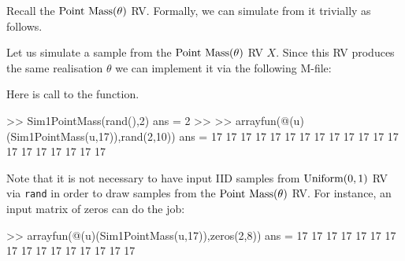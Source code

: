 Recall the $\pointmass(\theta)$ RV. Formally, we can simulate from it trivially as follows.
\begin{simulation}[$\pointmass(\theta)$]\label{SIM:PointMass}
Let us simulate a sample from the $\pointmass(\theta)$ RV $X$.  Since this RV produces the same realisation $\theta$ we can implement it via the following M-file:

Here is call to the function.
\begin{VrbM}
>> Sim1PointMass(rand(),2)
ans =     2
>> %
>> arrayfun(@(u)(Sim1PointMass(u,17)),rand(2,10))
ans =
    17    17    17    17    17    17    17    17    17    17
    17    17    17    17    17    17    17    17    17    17
\end{VrbM}
Note that it is not necessary to have input IID samples from $\mbox{{\rm Uniform}}(0,1)$ RV via {\tt rand} in order to draw samples from the $\pointmass(\theta)$ RV.  For instance, an input matrix of zeros can do the job:
\begin{VrbM}
>> arrayfun(@(u)(Sim1PointMass(u,17)),zeros(2,8))
ans =
    17    17    17    17    17    17    17    17
    17    17    17    17    17    17    17    17
\end{VrbM}
\end{simulation}


